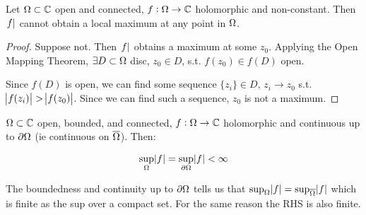 
\begin{corollary}


Let $\Omega \subset \mathbb{C}$ open and connected, $f:\Omega \rightarrow \mathbb{C}$ holomorphic and non-constant. Then $\abs{f}$ cannot obtain a local maximum at any point in $\Omega$.
\end{corollary}


\begin{proof}
Suppose not. Then $\abs{f}$ obtains a maximum at some $z_0$. Applying the Open Mapping Theorem, $\exists D \subset \Omega$ disc, $ z_0 \in D $, s.t. $f(z_0) \in f(D)$ open.


Since $f(D)$ is open, we can find some sequence $ \{ z_i \} \in D, \, z_i \to z_0 $ s.t. $\abs{f(z_i)} > \abs{f(z_0)}$. Since we can find such a sequence, $z_0$ is not a maximum.
\end{proof}

\begin{corollary}
$\Omega \subset \mathbb{C}$ open, bounded, and connected, $f:\Omega \rightarrow \mathbb{C}$ holomorphic and continuous up to $\partial \Omega$ (ie continuous on $\overline{\Omega}$). Then:

\begin{align*}
    \sup_{\Omega} \abs{f} = \sup_{\partial \Omega} \abs{f} < \infty
\end{align*}
\end{corollary}
\begin{note}
The boundedness and continuity up to $\partial \Omega$ tells us that $\sup_{\Omega} \abs{f} = \sup_{\overline{\Omega}}\abs{f}$ which is finite as the sup over a compact set. For the same reason the RHS is also finite.
\end{note}

